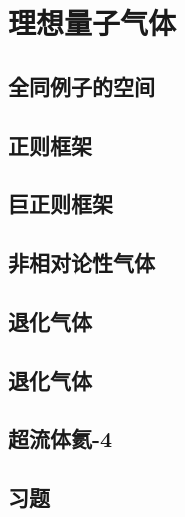 \chapter{理想量子气体}

\section{全同例子的空间}
\section{正则框架}
\section{巨正则框架}
\section{非相对论性气体}
\section{退化气体}
\section{退化气体}
\section{超流体氦-4}
\section*{习题}